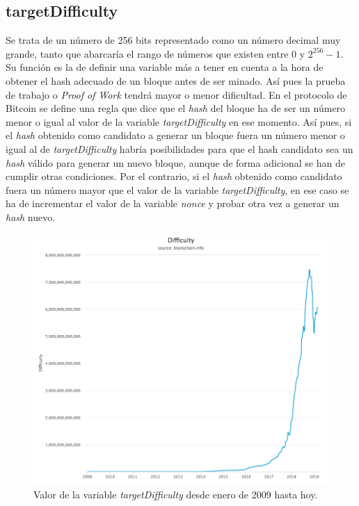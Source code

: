\documentclass{article}
\begin{document}
    \subsection{targetDifficulty}
    Se trata de un número de 256 bits representado como un número decimal muy grande, tanto que abarcaría el rango de números que existen entre $0$ y $2^{256}-1$. Su función es la de definir una variable más a tener en cuenta a la hora de obtener el hash adecuado de un bloque antes de ser minado. Así pues la prueba de trabajo o \textit{Proof of Work} tendrá mayor o menor dificultad. En el protocolo de Bitcoin se define una regla que dice que el \textit{hash} del bloque ha de ser un número menor o igual al valor de la variable \textit{targetDifficulty} en ese momento. Así pues, si el \textit{hash} obtenido como candidato a generar un bloque fuera un número menor o igual al de \textit{targetDifficulty} habría posibilidades para que el hash candidato sea un \textit{hash} válido para generar un nuevo bloque, aunque de forma adicional se han de cumplir otras condiciones. Por el contrario, si el \textit{hash} obtenido como candidato fuera un número mayor que el valor de la variable \textit{targetDifficulty}, en ese caso se ha de incrementar el valor de la variable \textit{nonce} y probar otra vez a generar un \textit{hash} nuevo.
    
    \begin{figure}[H]
    \centering
        \includegraphics[scale=0.39]{img/Bitcoin_TargetDifficulty.png}
        \caption{Valor de la variable \textit{targetDifficulty} desde enero de 2009 hasta hoy.}
    \end{figure}
    
\end{document}
